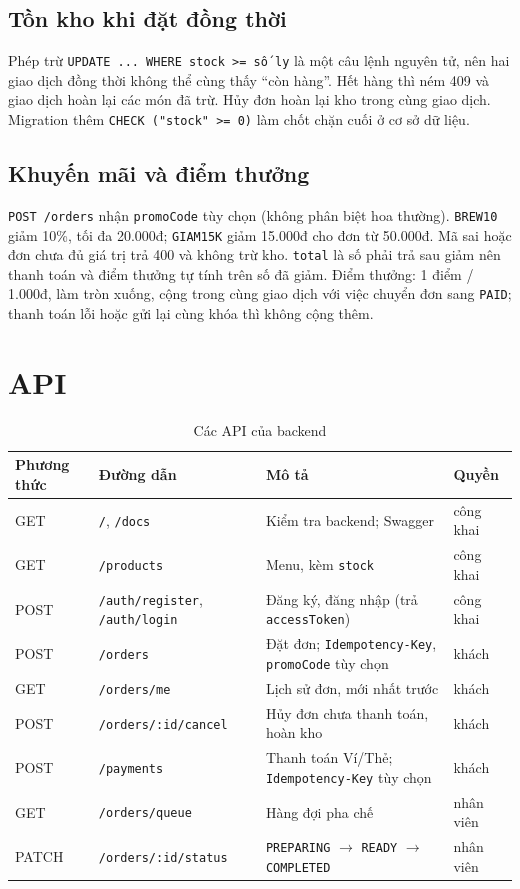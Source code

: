 \documentclass[12pt, a4paper]{article}
\begin{document}
\subsection{Tồn kho khi đặt đồng thời}
Phép trừ \texttt{UPDATE ... WHERE stock >= số ly} là một câu lệnh nguyên tử, nên hai giao dịch đồng thời không thể cùng thấy
``còn hàng''. Hết hàng thì ném 409 và giao dịch hoàn lại các món đã trừ. Hủy đơn hoàn lại kho trong cùng giao dịch.
Migration thêm \texttt{CHECK ("stock" >= 0)} làm chốt chặn cuối ở cơ sở dữ liệu.

\subsection{Khuyến mãi và điểm thưởng}
\texttt{POST /orders} nhận \texttt{promoCode} tùy chọn (không phân biệt hoa thường). \texttt{BREW10} giảm 10\%, tối đa 20.000đ;
\texttt{GIAM15K} giảm 15.000đ cho đơn từ 50.000đ. Mã sai hoặc đơn chưa đủ giá trị trả 400 và không trừ kho.
\texttt{total} là số phải trả sau giảm nên thanh toán và điểm thưởng tự tính trên số đã giảm. Điểm thưởng: 1 điểm / 1.000đ,
làm tròn xuống, cộng trong cùng giao dịch với việc chuyển đơn sang \texttt{PAID}; thanh toán lỗi hoặc gửi lại cùng khóa thì không cộng thêm.

\section{API}
\begin{table}[H]\centering\footnotesize
\begin{tabularx}{\textwidth}{@{}l l X l@{}}
\toprule \textbf{Phương thức} & \textbf{Đường dẫn} & \textbf{Mô tả} & \textbf{Quyền} \\ \midrule
GET & \texttt{/}, \texttt{/docs} & Kiểm tra backend; Swagger & công khai \\
GET & \texttt{/products} & Menu, kèm \texttt{stock} & công khai \\
POST & \texttt{/auth/register}, \texttt{/auth/login} & Đăng ký, đăng nhập (trả \texttt{accessToken}) & công khai \\
POST & \texttt{/orders} & Đặt đơn; \texttt{Idempotency-Key}, \texttt{promoCode} tùy chọn & khách \\
GET & \texttt{/orders/me} & Lịch sử đơn, mới nhất trước & khách \\
POST & \texttt{/orders/:id/cancel} & Hủy đơn chưa thanh toán, hoàn kho & khách \\
POST & \texttt{/payments} & Thanh toán Ví/Thẻ; \texttt{Idempotency-Key} tùy chọn & khách \\
GET & \texttt{/orders/queue} & Hàng đợi pha chế & nhân viên \\
PATCH & \texttt{/orders/:id/status} & \texttt{PREPARING} $\rightarrow$ \texttt{READY} $\rightarrow$ \texttt{COMPLETED} & nhân viên \\ \bottomrule
\end{tabularx}
\caption{Các API của backend}
\end{table}
\end{document}
